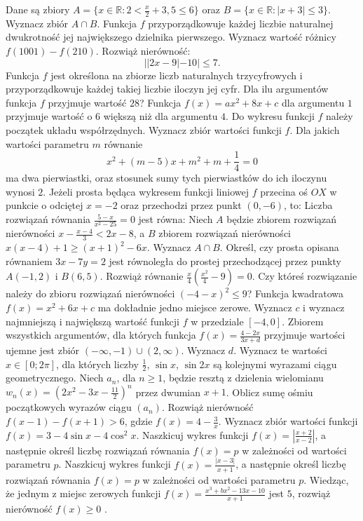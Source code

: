 Dane są zbiory $A=\{x\in\mathbb{R}: 2<\frac{x}{2}+3,5\leq 6\}$ oraz $B=\{x\in\mathbb{R}:|x+3|\leq 3\}$. Wyznacz zbiór $A\cap B$.
Funkcja $f$ przyporządkowuje każdej liczbie naturalnej dwukrotność jej największego dzielnika pierwszego. Wyznacz wartość różnicy $f(1001)-f(210)$. 
Rozwiąż nierówność: $$||2x-9|-10|\leq 7.$$
Funkcja $f$ jest określona na zbiorze liczb naturalnych trzycyfrowych i przyporządkowuje każdej takiej liczbie iloczyn jej cyfr. Dla ilu argumentów funkcja $f$ przyjmuje wartość $28$?
Funkcja $f(x)=ax^2+8x+c$ dla argumentu $1$ przyjmuje wartość o $6$ większą niż dla argumentu $4$. Do wykresu funkcji $f$ należy początek układu współrzędnych. Wyznacz zbiór wartości funkcji $f$.
Dla jakich wartości parametru $m$ równanie $$x^2+(m-5)x+m^2+m+\frac{1}{4}=0$$ ma dwa pierwiastki, oraz stosunek sumy tych pierwiastków do ich iloczynu wynosi $2$.
Jeżeli prosta będąca wykresem funkcji liniowej $f$ przecina oś $OX$ w punkcie o odciętej $x=-2$ oraz przechodzi przez punkt $(0,-6)$, to:
Liczba rozwiązań równania $\frac{5-x}{x^2-25}=0$ jest równa:
Niech $A$ będzie zbiorem rozwiązań nierówności $x-\frac{x-4}{3}<2x-8$, a $B$ zbiorem rozwiązań nierówności $x(x-4)+1\geq (x+1)^2-6x$. Wyznacz $A\cap B$.
Określ, czy prosta opisana równaniem $3x-7y=2$ jest równoległa do prostej przechodzącej przez punkty $A(-1,2)$ i $B(6,5)$.
Rozwiąż równanie $\frac{x}{4} (\frac{x^2}{4}-9)=0$. Czy któreś rozwiązanie należy do zbioru rozwiązań nierówności $(-4-x)^2\leq 9$?
Funkcja kwadratowa $f(x)=x^2+6x+c$ ma dokładnie jedno miejsce zerowe. Wyznacz $c$ i wyznacz najmniejszą i największą wartość funkcji $f$ w przedziale $[-4,0]$.
Zbiorem wszystkich argumentów, dla których funkcja $f(x)=\frac{4-2x}{3x+d}$ przyjmuje wartości ujemne jest zbiór $(-\infty , -1)\cup (2,\infty)$. Wyznacz $d$.
Wyznacz te wartości $x\in [0;2\pi]$, dla których liczby $\frac{1}{2}$, $\sin x$, $\sin 2x$ są kolejnymi wyrazami ciągu geometrycznego.
Niech $a_n$, dla $n\geq 1$, będzie resztą z dzielenia wielomianu $w_n(x)=\left(2x^2-3x-\frac{11}{2}\right)^n$ przez dwumian $x+1$. Oblicz sumę ośmiu początkowych wyrazów ciągu $(a_n)$.
Rozwiąż nierówność $f(x-1)-f(x+1)>6$, gdzie $f(x)=4-\frac{3}{x}$.
Wyznacz zbiór wartości funkcji $f(x)=3-4\sin x-4\cos^2 x$.
Naszkicuj wykres funkcji $f(x)=\left| \frac{x+2}{x-2}\right|$, a następnie określ liczbę rozwiązań równania $f(x)=p$ w zależności od wartości parametru $p$.
Naszkicuj wykres funkcji $f(x)=\frac{|x-3|}{x+1}$, a następnie określ liczbę rozwiązań równania $f(x)=p$ w zależności od wartości parametru $p$.
Wiedząc, że jednym z miejsc zerowych funkcji $f(x)=\frac{x^3+bx^2-13x-10}{x+1}$ jest $5$, rozwiąż nierówność $f(x)\geq 0$ .
